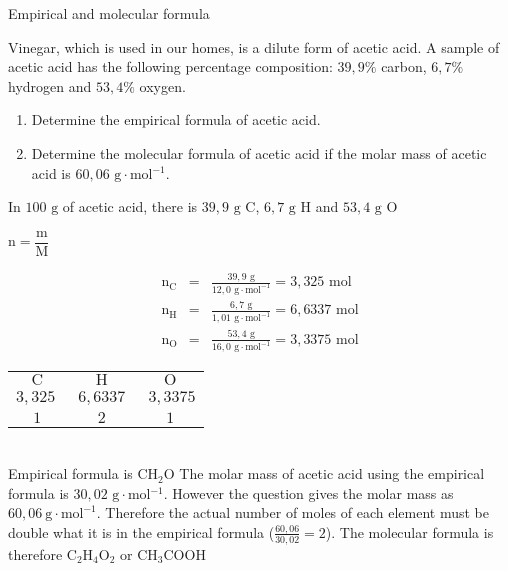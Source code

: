     \noindent
\label{m38712*secfhsst!!!underscore!!!id1308} 
      \noindent 
      \begin{wex}{Empirical and molecular formula
      }
 {
Vinegar, which is used in our homes, is a dilute form of acetic acid. A sample of acetic acid has the following percentage composition: $39,9\%$ carbon, $6,7\%$ hydrogen and $53,4\%$ oxygen.  
\begin{enumerate}[noitemsep, label=\textbf{\arabic*}. ] 
\item Determine the empirical formula of acetic acid.
\item Determine the molecular formula of acetic acid if the molar mass of acetic acid is $60,06 \text{ g} \cdot \text{mol}{}^{-1}$.
\end{enumerate}
     }
{
      \label{m38712*id281607}In $100 \text{ g}$ of acetic acid, there is $39,9 \text{ g C}$, $6,7 \text{ g H}$ and $53,4\text{ g O}$ 

        $\text{n}=\dfrac{\text{m}}{\text{M}}$
      
      \label{m38712*id281653}\nopagebreak\noindent{}
        
    \begin{eqnarray*}
{\text{n}}_{\text{C}} & = & \frac{39,9 \text{ g}}{12,0 \text{ g} \cdot \text{mol}^{-1}} = 3,325 \text{ mol} \\
{\text{n}}_{\text{H}} & = & \frac{6,7 \text{ g}}{1,01 \text{ g} \cdot \text{mol}^{-1}} = 6,6337 \text{ mol} \\
{\text{n}}_{\text{O}} & = & \frac{53,4 \text{ g}}{16,0 \text{ g} \cdot \text{mol}^{-1}} = 3,3375 \text{ mol}
      \end{eqnarray*}
\begin{tabular}{c@{:}c@{:}c}
$\text{C}$ & $\text{H}$ & $\text{O}$\\
$3,325~$ & $~6,6337~$ & $~3,3375$ \\
$1$ & $2$ & $1$\\
\end{tabular}\\
Empirical formula is $\text{CH}{}_{2}\text{O}$ 
      \label{m38712*id281834}The molar mass of acetic acid using the empirical formula is $30,02 \text{ g} \cdot \text{mol}{}^{-1}$. However the question gives the molar mass as $60,06~\text{g}\cdot \text{mol}^{-1}$. Therefore the actual number of moles of each element must be double what it is in the empirical formula ($\frac{60,06}{30,02}=2$).
      \label{m38712*id281854}The molecular formula is therefore $\text{C}{}_{2}\text{H}{}_{4}\text{O}{}_{2}$ or $\text{CH}{}_{3}\text{COOH}$
}
    \end{wex}
